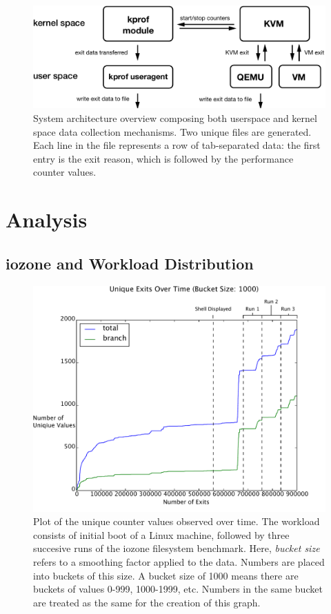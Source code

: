 \documentclass[notitlepage]{article}
\begin{document}
\begin{figure}[htp]
    \centering
    \includegraphics[width=4.5in]{diagram.pdf}
    \caption{System architecture overview composing both userspace and kernel
    space data collection mechanisms. Two unique files are generated. Each line
in the file represents a row of tab-separated data: the first entry is
the exit reason, which is followed by the performance counter values.}
    \label{fig:diagram}
\end{figure}


\section{Analysis}
\label{sec:analysis}

\subsection{iozone and Workload Distribution}
\begin{figure}[htp]
    \centering
    \includegraphics[width=4.5in]{iozone_plot.pdf}
    \caption{Plot of the unique counter values observed over time. The workload
    consists of initial boot of a Linux machine, followed by three succesive
runs of the iozone filesystem benchmark. Here, \textit{bucket size} refers to
a smoothing factor applied to the data. Numbers are placed into buckets of this
size. A bucket size of 1000 means there are buckets of values 0-999, 1000-1999,
etc. Numbers in the same bucket are treated as the same for the creation of this
graph.}
    \label{fig:iozoneplot}
\end{figure}
\end{document}
